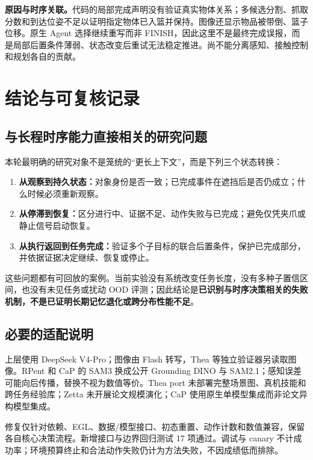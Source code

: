 \documentclass[UTF8,11pt,a4paper,fontset=none]{ctexart}
\begin{document}
\textbf{原因与时序关联。}代码的局部完成声明没有验证真实物体关系；多候选分割、抓取分数和到达位姿不足以证明指定物体已入篮并保持。图像还显示物品被带倒、篮子位移。原生 Agent 选择继续重写而非 FINISH，因此这里不是最终完成误报，而是局部后置条件薄弱、状态改变后重试无法稳定推进。尚不能分离感知、接触控制和规划各自的贡献。

\clearpage\section{结论与可复核记录}
\subsection*{与长程时序能力直接相关的研究问题}
本轮最明确的研究对象不是笼统的“更长上下文”，而是下列三个状态转换：
\begin{enumerate}[leftmargin=1.6em,itemsep=0.4em,topsep=0.2em]
\item \textbf{从观察到持久状态：}对象身份是否一致；已完成事件在遮挡后是否仍成立；什么时候必须重新观察。
\item \textbf{从停滞到恢复：}区分进行中、证据不足、动作失败与已完成；避免仅凭夹爪或静止信号启动恢复。
\item \textbf{从执行返回到任务完成：}验证多个子目标的联合后置条件，保护已完成部分，并依据证据决定继续、恢复或停止。
\end{enumerate}

这些问题都有可回放的案例。当前实验没有系统改变任务长度，没有多种子置信区间，也没有未见任务或扰动 OOD 评测；因此结论是\textbf{已识别与时序决策相关的失败机制，不是已证明长期记忆退化或跨分布性能不足}。

\subsection*{必要的适配说明}
上层使用 DeepSeek V4-Pro；图像由 Flash 转写，Thea 等独立验证器另读取图像。RPent 和 CaP 的 SAM3 换成公开 Grounding DINO 与 SAM2.1；感知误差可能向后传播，替换不视为数值等价。Thea port 未部署完整场景图、真机技能和跨任务经验库；Zetta 未开展论文规模演化；CaP 使用原生单模型集成而非论文异构模型集成。

修复仅针对依赖、EGL、数据/模型接口、初态重置、动作计数和数值兼容，保留各自核心决策流程。新增接口与边界回归测试 17 项通过。调试与 canary 不计成功率；环境预算终止和合法动作失败仍计为方法失败，不因成绩低而排除。
\end{document}
